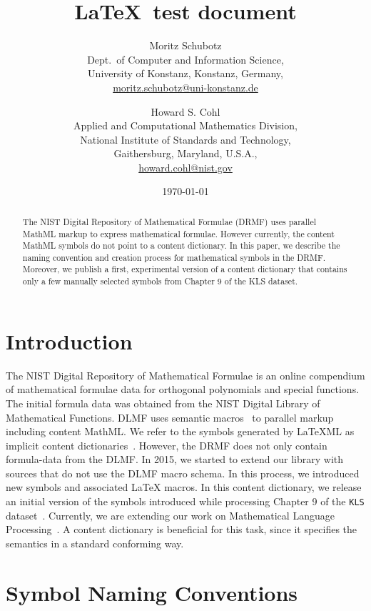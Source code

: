 \documentclass[]{article}
\title{\LaTeX~test document}
\author{
  Moritz Schubotz\\
  Dept.~of Computer and Information Science,\\
  University of Konstanz, Konstanz, Germany,\\
\url{moritz.schubotz@uni-konstanz.de}\\[0.2cm]
\and
  Howard S. Cohl\\
  Applied and Computational Mathematics Division,\\
  National Institute of Standards and Technology,\\
  Gaithersburg, Maryland, U.S.A.,\\
\url{howard.cohl@nist.gov}
}
\date{\today}
\newcommand{\MathML}{MathML}
\newcommand{\LaTeXML}{\LaTeX ML}
\begin{document}
    \maketitle

    \begin{abstract}
  The NIST Digital Repository of Mathematical Formulae (DRMF) uses 
  parallel MathML markup to express mathematical formulae. However 
  currently, the content MathML symbols do not point to a content 
  dictionary. In this paper, we describe the naming convention and 
  creation process for mathematical symbols in the DRMF. Moreover, we 
  publish a first, experimental version of a content dictionary that 
  contains only a few manually selected symbols from Chapter 9 of 
  the KLS dataset.
\end{abstract}

    \section{Introduction}

The NIST Digital Repository of Mathematical Formulae is an online compendium of mathematical formulae data for orthogonal polynomials 
and special functions.
The initial formula data was obtained from the NIST Digital Library of Mathematical Functions.
DLMF uses semantic macros~ to parallel markup including content \MathML.
We refer to the symbols generated by \LaTeXML{} as implicit content dictionaries~.
However, the DRMF does not only contain formula-data from the DLMF.
In 2015, we started to extend our library with sources that do not use the DLMF macro schema.
In this process, we introduced new symbols and associated \LaTeX{} macros.
In this content dictionary, we release an initial version of the symbols introduced while processing Chapter 9 %
of the {\tt KLS} dataset~.
Currently, we are extending our work on Mathematical Language Processing~.
A content dictionary is beneficial for this task, since it specifies the semantics in a standard conforming way.

\section{Symbol Naming Conventions}\label{sc.nc}
\end{document}

